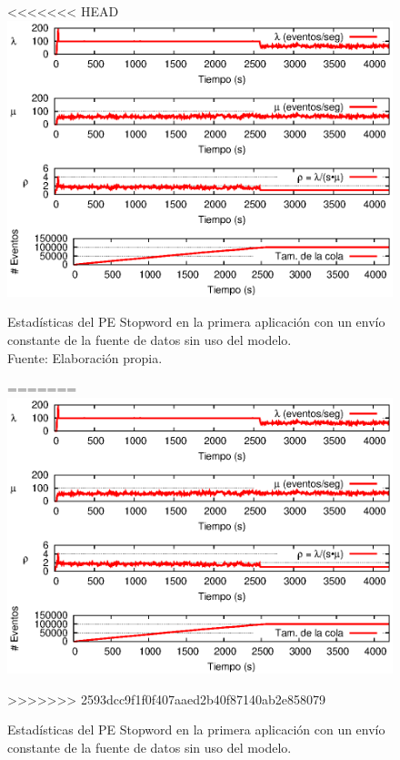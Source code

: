 \begin{figure}[!ht]
<<<<<<< HEAD
    \centering
    \captionsetup{justification=centering}
    \includegraphics[scale=0.9]{images/exp/app1/uniform/sm/statusStopwordPE.eps}
    \caption[Estadísticas del PE Stopword en la primera aplicación con un envío constante de la fuente de datos sin uso del modelo.]{Estadísticas del PE Stopword en la primera aplicación con un envío constante de la fuente de datos sin uso del modelo.\\Fuente: Elaboración propia.}
=======
\centering
    \includegraphics[scale=1]{images/exp/app1/uniform/sm/statusStopwordPE.eps}
    \caption{Estad\'isticas del PE Stopword en la primera aplicaci\'on con un env\'io constante de la fuente de datos sin uso del modelo.}
>>>>>>> 2593dcc9f1f0f407aaed2b40f87140ab2e858079
    \label{fig:app1-uniform-statusStopwordPE-sm}
\end{figure}

